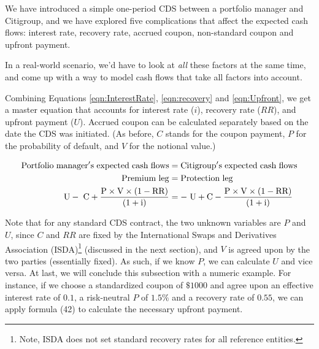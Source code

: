 \documentclass{jss}
\begin{document}
We have introduced a simple one-period CDS between a portfolio manager and Citigroup, and we have explored five complications that affect the expected cash flows: interest rate, recovery rate, accrued coupon, non-standard coupon and upfront payment.

In a real-world scenario, we'd have to look at \emph{all} these factors at the same time, and come up with a way to model cash flows that take all factors into account.

Combining Equations \eqref{eqn:InterestRate}, \eqref{eqn:recovery} and \eqref{eqn:Upfront}, we get a master equation that accounts for interest rate ($i$), recovery rate ($RR$), and upfront payment ($U$). Accrued coupon can be calculated separately based on the date the CDS was initiated. (As before, $C$ stands for the coupon payment, $P$ for the probability of default, and $V$ for the notional value.)

\begin{align}
  \rm Portfolio\hspace{3pt}manager's\hspace{3pt}expected\hspace{3pt}cash\hspace{3pt}flows &= \rm Citigroup's\hspace{3pt}expected\hspace{3pt}cash\hspace{3pt}flows \\
  \rm Premium\hspace{3pt}leg &= \rm Protection\hspace{3pt}leg \\
  \rm U -\hspace{3pt}C + \frac{P \times V \times (1 - RR)}{(1 + i)}  &= \rm -\hspace{3pt}U + C - \frac{P \times V \times (1 - RR)}{(1 + i)}
\end{align}

Note that for any standard CDS contract, the two unknown variables are $P$ and $U$, since $C$ and $RR$ are fixed by the International Swaps and Derivatives Association (ISDA)\footnote{Note, ISDA does not set standard recovery rates for all reference entities.} (discussed in the next section), and $V$ is agreed upon by the two parties (essentially fixed). As such, if we know $P$, we can calculate $U$ and vice versa. At last, we will conclude this subsection with a numeric example. For instance, if we choose a standardized coupon of $\$1000$ and agree upon an effective interest rate of $0.1$, a risk-neutral $P$ of $1.5\%$ and a recovery rate of $0.55$, we can apply formula (42) to calculate the necessary upfront payment. \\
\end{document}

